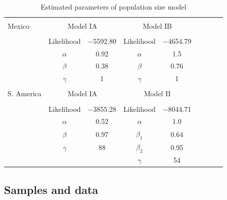 \renewcommand{\arraystretch}{1.1}
\begin{table}[tb]

\begin{center}
 \caption[]{Estimated parameters of population size model}
  \textbf{}\\[-2mm]
{\fontsize{7}{11}\sf
    \begin{tabular}{lcccccccl} \hline
       & & \\[-3mm]
     Mexico  & \multicolumn{2}{c}{Model IA}  &\multicolumn{2}{c}{Model IB}\\[0.1cm]
    \hline
    & & \\[-3mm]
   & Likelihood   & $-$5592.80 & Likelihood       &  $-$4654.79 \\
   &$\alpha$      & 0.92             & $\alpha$        & 1.5 \\
   &$\beta$        & 0.38             & $\beta$          & 0.76\\ 
   &$\gamma$   & 1                   &  $\gamma$   & 1\\ 
      \hline
    & & \\[-3mm]
    S. America  & \multicolumn{2}{c}{Model IA}  &\multicolumn{2}{c}{Model II}\\[0.1cm]
        \hline
     & & \\[-3mm]
      & Likelihood   &  $-$3855.28 & Likelihood     &  $-$8044.71 \\
      &$\alpha$      & 0.52              & $\alpha$       & 1.0 \\
      &$\beta$        & 0.97             & $\beta_1$      & 0.64\\ 
      &$\gamma$   & 88                &  $\beta_2$     & 0.95\\ 
      &                    &                     &  $\gamma$    & 54\\ [1mm]
    \hline
    \end{tabular}
    \label{param}  %
}
\end{center}
\end{table}
\renewcommand{\arraystretch}{1}


\subsection*{Samples and data}


